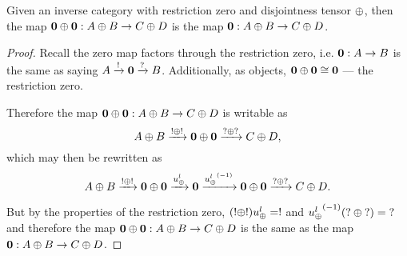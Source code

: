 \begin{lemma}\label{lem:zero_plus_zero_is_zero}
  Given an inverse category \X with restriction zero and disjointness tensor $\oplus$, then the map
  $\mathbf{0}\oplus\mathbf{0}: A\oplus B \to C\oplus D$ is the map $\mathbf{0}: A\oplus B \to C\oplus D$.
\end{lemma}
\begin{proof}
  Recall the zero map factors through the restriction zero, i.e. $\mathbf{0}:A \to B$ is the same as
  saying $A\xrightarrow{!} \mathbf{0} \xrightarrow{\mathbf{?}}B$. Additionally, as objects, $\mathbf{0}\oplus\mathbf{0} \cong \mathbf{0}$ ---
  the restriction zero.

  Therefore the map $\mathbf{0}\oplus\mathbf{0}: A\oplus B \to C\oplus D$ is writable as
  \[
    A\oplus B \xrightarrow{!\oplus!}\mathbf{0}\oplus\mathbf{0}  \xrightarrow{\mathbf{?}\oplus\mathbf{?}} C\oplus D,
  \]
  which may then be rewritten as
  \[
    A\oplus B \xrightarrow{!\oplus!}\mathbf{0}\oplus\mathbf{0} \xrightarrow{u_{\oplus}^l} \mathbf{0}
      \xrightarrow{{u_{\oplus}^l}^{(-1)}} \mathbf{0}\oplus\mathbf{0} \xrightarrow{\mathbf{?}\oplus\mathbf{?}} C\oplus D.
  \]

  But by the properties of the restriction zero, $(!\oplus!) u_{\oplus}^l = !$ and ${u_{\oplus}^l}^{(-1)}(\mathbf{?}\oplus\mathbf{?}) = \mathbf{?}$
  and therefore the map $\mathbf{0}\oplus\mathbf{0}: A\oplus B \to C\oplus D$ is the same as the map $\mathbf{0}: A\oplus B \to C\oplus D$.
\end{proof}


